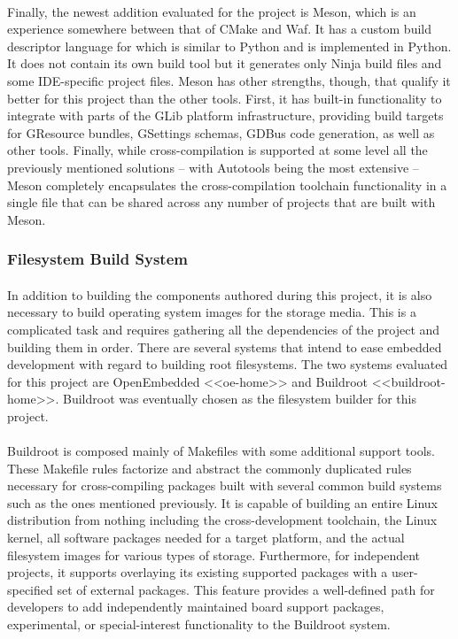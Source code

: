 \paragraph{}
Finally, the newest addition evaluated for the project is Meson, which is an experience somewhere between that of CMake and Waf.
It has a custom build descriptor language for which is similar to Python and is implemented in Python.
It does not contain its own build tool but it generates only Ninja build files and some IDE-specific project files.
Meson has other strengths, though, that qualify it better for this project than the other tools.
First, it has built-in functionality to integrate with parts of the GLib platform infrastructure, providing build targets for GResource bundles, GSettings schemas, GDBus code generation, as well as other tools.
Finally, while cross-compilation is supported at some level all the previously mentioned solutions -- with Autotools being the most extensive -- Meson completely encapsulates the cross-compilation toolchain functionality in a single file that can be shared across any number of projects that are built with Meson.

\subsubsection{Filesystem Build System}

\paragraph{}
In addition to building the components authored during this project, it is also necessary to build operating system images for the storage media.
This is a complicated task and requires gathering all the dependencies of the project and building them in order.
There are several systems that intend to ease embedded development with regard to building root filesystems.
The two systems evaluated for this project are OpenEmbedded <<oe-home>> and Buildroot <<buildroot-home>>.
Buildroot was eventually chosen as the filesystem builder for this project.

\paragraph{}
Buildroot is composed mainly of Makefiles with some additional support tools.
These Makefile rules factorize and abstract the commonly duplicated rules necessary for cross-compiling packages built with several common build systems such as the ones mentioned previously.
It is capable of building an entire Linux distribution from nothing including the cross-development toolchain, the Linux kernel, all software packages needed for a target platform, and the actual filesystem images for various types of storage.
Furthermore, for independent projects, it supports overlaying its existing supported packages with a user-specified set of external packages.
This feature provides a well-defined path for developers to add independently maintained board support packages, experimental, or special-interest functionality to the Buildroot system.

